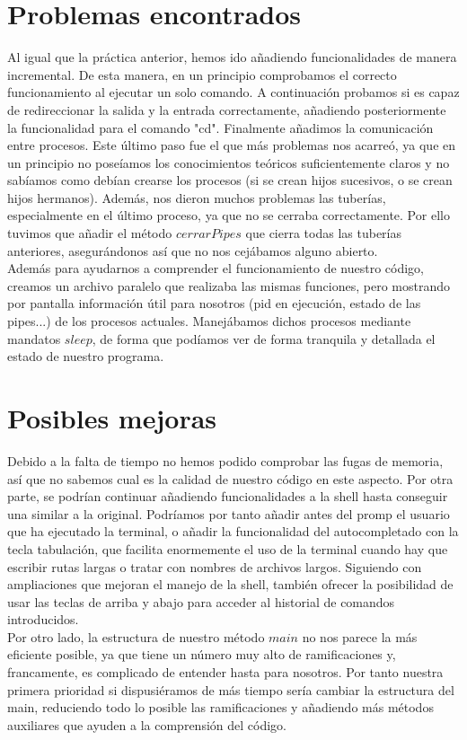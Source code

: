 \section{Problemas encontrados}
Al igual que la práctica anterior, hemos ido añadiendo funcionalidades de manera incremental. De esta manera, en un principio comprobamos el correcto funcionamiento al ejecutar un solo comando. A continuación probamos si es capaz de redireccionar la salida y la entrada correctamente, añadiendo posteriormente la funcionalidad para el comando "cd". Finalmente añadimos la comunicación entre procesos. Este último paso fue el que más problemas nos acarreó, ya que en un principio no poseíamos los conocimientos teóricos suficientemente claros y no sabíamos como debían crearse los procesos (si se crean hijos sucesivos, o se crean hijos hermanos). Además, nos dieron muchos problemas las tuberías, especialmente en el último proceso, ya que no se cerraba correctamente. Por ello tuvimos que añadir el método $cerrarPipes$ que cierra todas las tuberías anteriores, asegurándonos así que no nos cejábamos alguno abierto.\\
Además para ayudarnos a comprender el funcionamiento de nuestro código, creamos un archivo paralelo que realizaba las mismas funciones, pero mostrando por pantalla información útil para nosotros (pid en ejecución, estado de las pipes...) de los procesos actuales. Manejábamos dichos procesos mediante mandatos $sleep$, de forma que podíamos ver de forma tranquila y detallada el estado de nuestro programa.
\section{Posibles mejoras}
Debido a la falta de tiempo no hemos podido comprobar las fugas de memoria, así que no sabemos cual es la calidad de nuestro código en este aspecto. Por otra parte, se podrían continuar añadiendo funcionalidades a la shell hasta conseguir una similar a la original. Podríamos por tanto añadir antes del promp el usuario que ha ejecutado la terminal, o añadir la funcionalidad del autocompletado con la tecla tabulación, que facilita enormemente el uso de la terminal cuando hay que escribir rutas largas o tratar con nombres de archivos largos. Siguiendo con ampliaciones que mejoran el manejo de la shell, también ofrecer la posibilidad de usar las teclas de arriba y abajo para acceder al historial de comandos introducidos.\\
Por otro lado, la estructura de nuestro método $main$ no nos parece la más eficiente posible, ya que tiene un número muy alto de ramificaciones y, francamente, es complicado de entender hasta para nosotros. Por tanto nuestra primera prioridad si dispusiéramos de más tiempo sería cambiar la estructura del main, reduciendo todo lo posible las ramificaciones y añadiendo más métodos auxiliares que ayuden a la comprensión del código. 
\newpage
